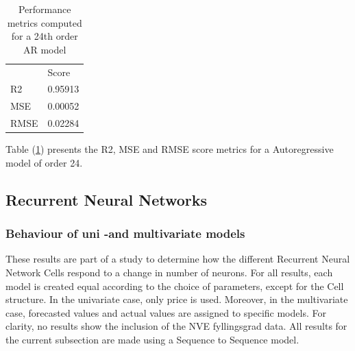\documentclass
[twocolumn,
secnumarabic,
nobibnotes,
aps,
prl,
reprint,
groupedaddress,
amsmath,
amssymb,
]{revtex4-2}
\begin{document}
\begin{table}[]
  \caption{\label{tab_ar} Performance metrics computed for a 24th order AR model}
  \begin{tabular}{l|l|}
       & Score   \\
  R2   & 0.95913 \\
  MSE  & 0.00052 \\
  RMSE & 0.02284
  \end{tabular}
\end{table}

Table (\ref{tab_ar}) presents the R2, MSE and RMSE score metrics for a Autoregressive model of order 24. 

\subsection{Recurrent Neural Networks}

\subsubsection{Behaviour of uni -and multivariate models}
These results are part of a study to determine how the different Recurrent Neural Network Cells respond to a change in number of neurons. For all results, each model is created equal according to the choice of parameters, except for the Cell structure. In the univariate case, only price is used. Moreover, in the multivariate case, forecasted values and actual values are assigned to specific models. For clarity, no results show the inclusion of the NVE fyllingsgrad data. All results for the current subsection are made using a Sequence to Sequence model.
\end{document}
